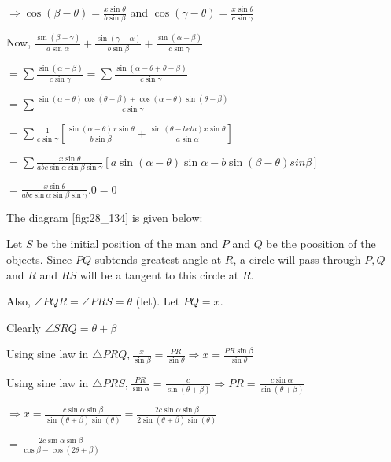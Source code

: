  $\Rightarrow \cos(\beta - \theta) = \frac{x\sin\theta}{b\sin\beta}$ and $\cos(\gamma -
  \theta) = \frac{x\sin\theta}{c\sin\gamma}$

  Now, $\frac{\sin(\beta - \gamma)}{a\sin\alpha} + \frac{\sin(\gamma - \alpha)}{b\sin\beta} +
  \frac{\sin(\alpha - \beta)}{c\sin\gamma}$

  $=\displaystyle\sum\frac{\sin(\alpha - \beta)}{c\sin\gamma} =
  \displaystyle\sum\frac{\sin(\alpha - \theta + \theta - \beta)}{c\sin\gamma}$

  $= \displaystyle\sum\frac{\sin(\alpha - \theta)\cos(\theta - \beta) + \cos(\alpha -
    \theta)\sin(\theta - \beta)}{c\sin\gamma}$

  $=\displaystyle\sum\frac{1}{c\sin\gamma}\left[\frac{\sin(\alpha - \theta)x\sin\theta}{b\sin\beta}
    + \frac{\sin(\theta - beta)x\sin\theta}{a\sin\alpha}\right]$

  $= \displaystyle\sum\frac{x\sin\theta}{abc\sin\alpha\sin\beta\sin\gamma}\left[a\sin(\alpha -
    \theta)\sin\alpha - b\sin(\beta - \theta)sin\beta\right]$

  $= \frac{x\sin\theta}{abc\sin\alpha\sin\beta\sin\gamma}.0 = 0$

\item The diagram [fig:28_134] is given below:

  \startplacefigure[reference=fig:28_134]
    \externalfigure[28_134.pdf]
  \stopplacefigure

  Let $S$ be the initial position of the man and $P$ and $Q$ be the poosition of the
  objects. Since $PQ$ subtends greatest angle at $R$, a circle will pass through $P, Q$
  and $R$ and $RS$ will be a tangent to this circle at $R$.

  Also, $\angle PQR = \angle PRS = \theta$ (let). Let $PQ = x$.

  Clearly $\angle SRQ = \theta + \beta$

  Using sine law in $\triangle PRQ, \frac{x}{\sin\beta} = \frac{PR}{\sin\theta} \Rightarrow x =
  \frac{PR\sin\beta}{\sin\theta}$

  Using sine law in $\triangle PRS, \frac{PR}{\sin\alpha} = \frac{c}{\sin(\theta + \beta)}
  \Rightarrow PR = \frac{c\sin\alpha}{\sin(\theta + \beta)}$

  $\Rightarrow x = \frac{c\sin\alpha\sin\beta}{\sin(\theta + \beta)\sin(\theta)} =
  \frac{2c\sin\alpha\sin\beta}{2\sin(\theta + \beta)\sin(\theta)}$

  $= \frac{2c\sin\alpha\sin\beta}{\cos\beta - \cos(2\theta + \beta)}$

